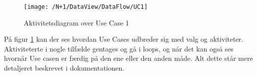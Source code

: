 \begin{figure}[H]
	\centering
	\texttt{[image: /N+1/DataView/DataFlow/UC1]}
	\caption{Aktivitetsdiagram over Use Case 1}
	\label{AktDia}
\end{figure}

På figur \ref{AktDia} kan der ses hvordan Use Cases udbreder sig med valg og aktiviteter. Aktiviteterte i nogle tilfælde gentages og gå i loops, og når det kan også ses hvornår Use casen er færdig på den ene eller den anden måde. Alt dette står mere detaljeret beskrevet i dokumentationen. 

 
 
  

